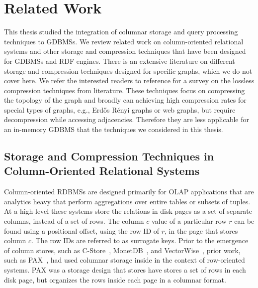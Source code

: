 \chapter{Related Work}
\label{c:related-works}

This thesis studied the integration of columnar storage and query processing techniques to GDBMSs. We review related work on column-oriented relational systems and other storage and compression techniques that have been designed for GDBMSs and RDF engines. There is an extensive literature on different storage and compression techniques designed for specific graphs, which we do not cover here. We refer the interested readers to reference \cite{Survey and Taxonomy of Lossless Graph Compression
and Space-Efficient Graph Representations} for a survey on the lossless compression techniques from literature. These techniques focus on compressing the topology of the graph and broadly can achieving high compression rates for special types of graphs, e.g., Erd\H{o}s R\'enyi graphs or web graphs, but require decompression while accessing adjacencies. Therefore they are less applicable for an in-memory GDBMS that the techniques we considered in this thesis.


\section{Storage and Compression Techniques in Column-Oriented Relational Systems}
\label{sec:column-stores-overview}

Column-oriented RDBMSs are designed primarily for OLAP applications that are analytics heavy that perform aggregations over entire tables or subsets of tuples. At a high-level these systems store the relations in disk pages as a set of separate columns, instead of a set of rows. The column $c$ value of a particular row $r$ can be found using a positional offset, using the row ID of $r$, in the page that stores column $c$. The row IDs are referred to as surrogate keys. Prior to the emergence of column stores, such as C-Store~\cite{}, MonetDB~\cite{}, and VectorWise~\cite{},  prior work, such as PAX~\cite{}, had used columnar storage inside in the context of row-oriented systems. PAX was a storage design that stores have stores a set of rows in each disk page, but organizes the rows inside each page in a columnar format. 

